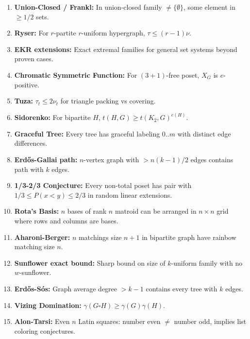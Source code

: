 \documentclass[aps,prd,amsmath,amssymb,twocolumn,superscriptaddress]{revtex4-2}
\begin{document}
\begin{enumerate}[label={\bf \arabic*.}, leftmargin=*, itemsep=2pt]
\item \textbf{Union-Closed / Frankl:} In union-closed family $\neq\{\emptyset\}$, some element in $\ge1/2$ sets.

\item \textbf{Ryser:} For $r$-partite $r$-uniform hypergraph, $\tau\le(r-1)\nu$.

\item \textbf{EKR extensions:} Exact extremal families for general set systems beyond proven cases.

\item \textbf{Chromatic Symmetric Function:} For $(3+1)$-free poset, $X_G$ is $e$-positive.

\item \textbf{Tuza:} $\tau_t\le2\nu_t$ for triangle packing vs covering.

\item \textbf{Sidorenko:} For bipartite $H$, $t(H,G)\ge t(K_2,G)^{e(H)}$.

\item \textbf{Graceful Tree:} Every tree has graceful labeling $0..m$ with distinct edge differences.

\item \textbf{Erd\H{o}s-Gallai path:} $n$-vertex graph with $>n(k-1)/2$ edges contains path with $k$ edges.

\item \textbf{1/3-2/3 Conjecture:} Every non-total poset has pair with $1/3\le P(x<y)\le2/3$ in random linear extensions.

\item \textbf{Rota's Basis:} $n$ bases of rank $n$ matroid can be arranged in $n\times n$ grid where rows and columns are bases.

\item \textbf{Aharoni-Berger:} $n$ matchings size $n+1$ in bipartite graph have rainbow matching size $n$.

\item \textbf{Sunflower exact bound:} Sharp bound on size of $k$-uniform family with no $w$-sunflower.

\item \textbf{Erd\H{o}s-S\'os:} Graph average degree $>k-1$ contains every tree with $k$ edges.

\item \textbf{Vizing Domination:} $\gamma(G\square H)\ge\gamma(G)\gamma(H)$.

\item \textbf{Alon-Tarsi:} Even $n$ Latin squares: number even $\neq$ number odd, implies list coloring conjectures.


\end{enumerate}
\end{document}
